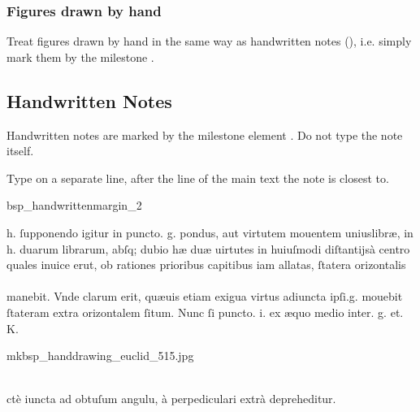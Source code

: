 \subsubsection{Figures drawn by hand}
Treat figures drawn by hand in the same way as handwritten notes (), i.e. simply mark them by the milestone .

\tocspace
\subsection{Handwritten Notes}
\label{section handwritten notes}

\begin{mainrule}
Handwritten notes are marked by the milestone element . Do not type the note itself.
\end{mainrule}

\begin{clarification}
Type  on a separate line, after the line of the main text the note is closest to.
\end{clarification}

\begin{sampleImage}{bsp_handwrittenmargin_2}

\begin{typeLatin}
 \someText
{}h. ſupponendo igitur in puncto. g. pondus, aut virtutem mouentem unius\lwr libræ,  in \\
h. duarum librarum, abſq; dubio hæ duæ uirtutes in huiuſmodi diſtantijs\lwr à centro \\
quales inuic\bs\tld{}e er\bs\tld{}ut, ob rationes prioribus capitibus iam allatas, \lwr ſtatera orizontalis \\
\\
manebit. Vnde clarum erit,  quæuis etiam exigua virtus adiuncta ipſi.\lwr g. mouebit \\
ſtateram extra orizontalem ſitum. Nunc ſi puncto. i. ex æquo medio inter. g. et. K.\\
\someText {}
\end{typeLatin}
\end{sampleImage}

\begin{sampleImage}{mkbsp_handdrawing_euclid_515.jpg}
\begin{typeLatin}
 \someText \\
ctè iuncta ad obtuſum angul\bs\tld{}u, à perp\bs\tld{}ediculari extrà depreh\bs\tld{}editur.\\
\end{typeLatin}

\end{sampleImage}

